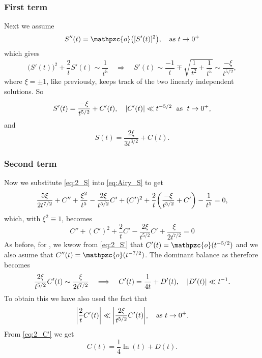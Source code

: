 \documentclass[11pt,letter, swedish, english
]{article}
\newcommand{\oh}{\ensuremath\mathpzc{o}}
\newcommand{\as}{\qcomma\text{as }}
\begin{document}
\subsubsection{First term}
Next we assume
\begin{equation}
S''(t)=\oh\qty([S'(t)]^2)\as\ttoz
\end{equation}
which gives
\begin{equation}
\Big(S'(t)\Big)^2+\frac{2}{t}S'(t)\sim\frac{1}{t^5}
\quad\Longrightarrow\quad
S'(t)\sim\frac{-1}{t}\mp\sqrt{\frac{1}{t^2}+\frac{1}{t^5}}
\sim\frac{-\xi}{t^{5/2}},
\end{equation}
where $\xi=\pm1$, like previously, keeps track of the two linearly
independent solutions. So
\begin{equation}\label{eq:2_S'}
S'(t)=\frac{-\xi}{t^{5/2}}+C'(t)\qcomma
\abs{C'(t)} \ll t^{-5/2} \;\text{ as }\; \ttoz,
\end{equation}
and
\begin{equation}\label{eq:2_S}
S(t)=\frac{2\xi}{3t^{3/2}}+C(t).
\end{equation}



\subsubsection{Second term}
Now we substitute \eqref{eq:2_S} into \eqref{eq:Airy_S} to get
\begin{equation}
\frac{5\xi}{2t^{7/2}}+C'' 
+\frac{\xi^2}{t^5} - \frac{2\xi}{t^{5/2}}C' + (C')^2
+\frac{2}{t}\qty(\frac{-\xi}{t^{5/2}}+C') - \frac{1}{t^5}=0,
\end{equation}
which, with $\xi^2\equiv1$, becomes
\begin{equation}\label{eq:Airy_C}
C'' + (C')^2 + \frac{2}{t}C' - \frac{2\xi}{t^{5/2}}C'
+\frac{\xi}{2t^{7/2}}=0
\end{equation}
As before, for \ttoz, we kwow from \eqref{eq:2_S'} that $C'(t)=\oh(t^{-5/2})$ and
we also asume that $C''(t)=\oh(t^{-7/2})$. The dominant balance as \ttoz
therefore becomes
\begin{equation}\label{eq:2_C'}
\frac{2\xi}{t^{5/2}}C'(t) \sim \frac{\xi}{2t^{7/2}}
\quad\Longrightarrow\quad
C'(t)=\frac{1}{4t}+D'(t)\qcomma |D'(t)|\ll t^{-1}.
\end{equation}
To obtain this we have also used the fact that
\begin{equation}
\abs{\frac{2}{t}C'(t)} \ll \abs{\frac{2\xi}{t^{5/2}}C'(t)}\as\ttoz.
\end{equation}
From \eqref{eq:2_C'} we get
\begin{equation}\label{eq:2_C}
C(t)=\frac{1}{4}\ln(t) + D(t).
\end{equation}
\end{document}
